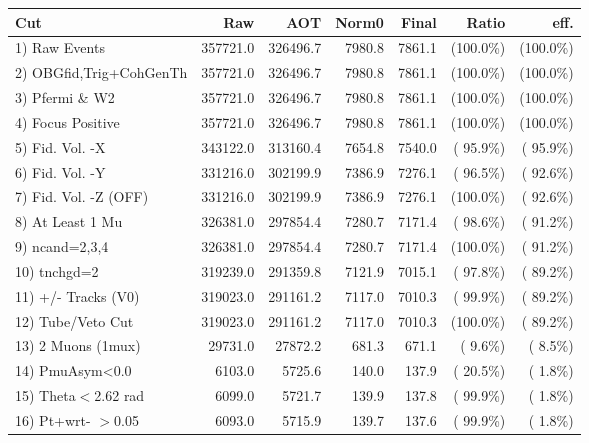  \begin{table}[h!]\centering
 \begin{tabular}{||l||r|r|r|r|r|r||}
 \hline
 \hline
 Cut & Raw & AOT & Norm0 & Final & Ratio & eff.       \\
 \hline
  1) Raw Events           &     357721.0 &     326496.7 &       7980.8 &       7861.1 & (100.0\%) & (100.0\%) \\
  2) OBGfid,Trig+CohGenTh &     357721.0 &     326496.7 &       7980.8 &       7861.1 & (100.0\%) & (100.0\%) \\
  3) Pfermi \& W2         &     357721.0 &     326496.7 &       7980.8 &       7861.1 & (100.0\%) & (100.0\%) \\
  4) Focus Positive       &     357721.0 &     326496.7 &       7980.8 &       7861.1 & (100.0\%) & (100.0\%) \\
  5) Fid. Vol. -X         &     343122.0 &     313160.4 &       7654.8 &       7540.0 & ( 95.9\%) & ( 95.9\%) \\
  6) Fid. Vol. -Y         &     331216.0 &     302199.9 &       7386.9 &       7276.1 & ( 96.5\%) & ( 92.6\%) \\
  7) Fid. Vol. -Z (OFF)   &     331216.0 &     302199.9 &       7386.9 &       7276.1 & (100.0\%) & ( 92.6\%) \\
  8) At Least 1 Mu        &     326381.0 &     297854.4 &       7280.7 &       7171.4 & ( 98.6\%) & ( 91.2\%) \\
  9) ncand=2,3,4          &     326381.0 &     297854.4 &       7280.7 &       7171.4 & (100.0\%) & ( 91.2\%) \\
 10) tnchgd=2             &     319239.0 &     291359.8 &       7121.9 &       7015.1 & ( 97.8\%) & ( 89.2\%) \\
 11) +/- Tracks (V0)      &     319023.0 &     291161.2 &       7117.0 &       7010.3 & ( 99.9\%) & ( 89.2\%) \\
 12) Tube/Veto Cut        &     319023.0 &     291161.2 &       7117.0 &       7010.3 & (100.0\%) & ( 89.2\%) \\
 13) 2 Muons (1mux)       &      29731.0 &      27872.2 &        681.3 &        671.1 & (  9.6\%) & (  8.5\%) \\
 14) PmuAsym<0.0          &       6103.0 &       5725.6 &        140.0 &        137.9 & ( 20.5\%) & (  1.8\%) \\
 15) Theta$<$2.62 rad     &       6099.0 &       5721.7 &        139.9 &        137.8 & ( 99.9\%) & (  1.8\%) \\
 16) Pt+wrt- $>$0.05      &       6093.0 &       5715.9 &        139.7 &        137.6 & ( 99.9\%) & (  1.8\%) \\

\end{tabular}
\end{table}
